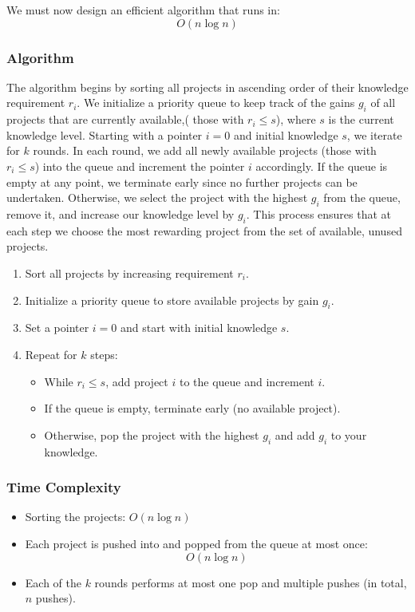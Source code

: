 \documentclass[12pt]{article}
\begin{document}
We must now design an efficient algorithm that runs in:
\[
\boxed{O(n \log n)}
\]

\subsubsection*{Algorithm}
The algorithm begins by sorting all projects in ascending order of their knowledge requirement $r_i$. We initialize a priority queue to keep track of the gains $g_i$ of all projects that are currently available,( those with $r_i \leq s$), where $s$ is the current knowledge level. 
Starting with a pointer $i = 0$ and initial knowledge $s$, we iterate for $k$ rounds. In each round, we add all newly available projects (those with $r_i \leq s$) into the queue and increment the pointer $i$ accordingly. If the queue is empty at any point, we terminate early since no further projects can be undertaken. Otherwise, we select the project with the highest $g_i$ from the queue, remove it, and increase our knowledge level by $g_i$. This process ensures that at each step we choose the most rewarding project from the set of available, unused projects.

\begin{enumerate}
    \item Sort all projects by increasing requirement $r_i$.
    \item Initialize a priority queue to store available projects by gain $g_i$.
    \item Set a pointer $i = 0$ and start with initial knowledge $s$.
    \item Repeat for $k$ steps:
    \begin{itemize}
        \item While $r_i \leq s$, add project $i$ to the queue and increment $i$.
        \item If the queue is empty, terminate early (no available project).
        \item Otherwise, pop the project with the highest $g_i$ and add $g_i$ to your knowledge.
    \end{itemize}
\end{enumerate}

\subsubsection*{Time Complexity}

\begin{itemize}
    \item Sorting the projects: $O(n \log n)$
    \item Each project is pushed into and popped from the queue at most once:
    \[
    O(n \log n)
    \]
    \item Each of the $k$ rounds performs at most one pop and multiple pushes (in total, $n$ pushes).
\end{itemize}
\end{document}
